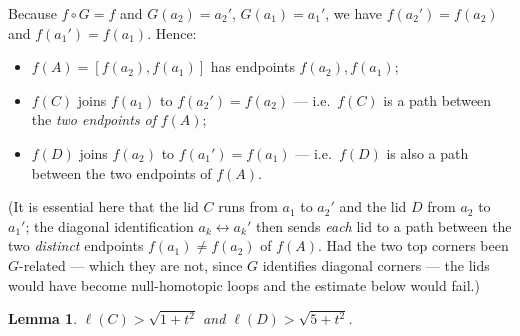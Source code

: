 \documentclass[12pt]{article}
\newtheorem{lemma}[theorem]{Lemma}
\begin{document}
Because $f\circ G=f$ and $G(a_2)=a_2'$, $G(a_1)=a_1'$, we have
$f(a_2')=f(a_2)$ and $f(a_1')=f(a_1)$. Hence:
\begin{itemize}
\item $f(A)=[f(a_2),f(a_1)]$ has endpoints $f(a_2),f(a_1)$;
\item $f(C)$ joins $f(a_1)$ to $f(a_2')=f(a_2)$ --- i.e.\ $f(C)$ is a path
between the \emph{two endpoints of} $f(A)$;
\item $f(D)$ joins $f(a_2)$ to $f(a_1')=f(a_1)$ --- i.e.\ $f(D)$ is also a
path between the two endpoints of $f(A)$.
\end{itemize}
(It is essential here that the lid $C$ runs from $a_1$ to $a_2'$ and the
lid $D$ from $a_2$ to $a_1'$; the diagonal identification
$a_k\!\leftrightarrow\!a_k'$ then sends \emph{each} lid to a path between
the two \emph{distinct} endpoints $f(a_1)\ne f(a_2)$ of $f(A)$. Had the
two top corners been $G$-related --- which they are not, since $G$
identifies diagonal corners --- the lids would have become null-homotopic
loops and the estimate below would fail.)

\begin{lemma}\label{lem:bound}
$\ell(C)>\sqrt{1+t^2}$ and $\ell(D)>\sqrt{5+t^2}$.
\end{lemma}
\end{document}
